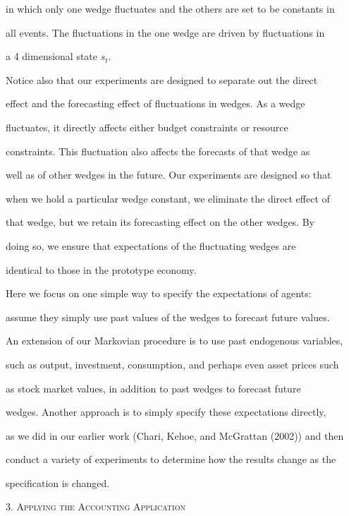\documentclass[fleqn,leqno,11pt]{article}
\begin{document}
in which only one wedge fluctuates and the others are set to be constants in

all events. The fluctuations in the one wedge are driven by fluctuations in

a 4 dimensional state $s_{t}.$



Notice also that our experiments are designed to separate out the direct

effect and the forecasting effect of fluctuations in wedges. As a wedge

fluctuates, it directly affects either budget constraints or resource

constraints. This fluctuation also affects the forecasts of that wedge as

well as of other wedges in the future. Our experiments are designed so that

when we hold a particular wedge constant, we eliminate the direct effect of

that wedge, but we retain its forecasting effect on the other wedges. By

doing so, we ensure that expectations of the fluctuating wedges are

identical to those in the prototype economy.



Here we focus on one simple way to specify the expectations of agents:

assume they simply use past values of the wedges to forecast future values.

An extension of our Markovian procedure is to use past endogenous variables,

such as output, investment, consumption, and perhaps even asset prices such

as stock market values, in addition to past wedges to forecast future

wedges. Another approach is to simply specify these expectations directly,

as we did in our earlier work (Chari, Kehoe, and McGrattan (2002)) and then

conduct a variety of experiments to determine how the results change as the

specification is changed.



\begin{center}

3. \textsc{Applying the Accounting Application}

\end{center}
\end{document}
